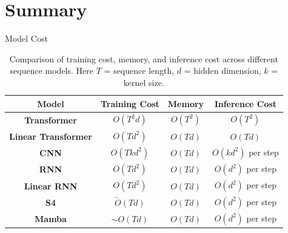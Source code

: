 \documentclass[xcolor=dvipsnames,aspectratio=169]{beamer}
\begin{document}
    \section{Summary}
        \begin{frame}{Model Cost}
            \begin{table}[h]
                \centering
                \renewcommand{\arraystretch}{1.4}
                \begin{tabular}{|c|c|c|c|}
                    \hline
                    \textbf{Model} & \textbf{Training Cost} & \textbf{Memory} & \textbf{Inference Cost} \\
                    \hline
                    \textbf{Transformer} 
                    & $O(T^2 d)$ 
                    & $O(T^2)$ 
                    & $O(T^2)$ \\
                    \hline
                    \textbf{Linear Transformer} 
                    & $O(T d^2)$ 
                    & $O(T d)$ 
                    & $O(T d)$ \\
                    \hline
                    \textbf{CNN}
                    & $O(T k d^2)$ 
                    & $O(T d)$ 
                    & $O(k d^2)$ per step \\
                    \hline
                    \textbf{RNN} 
                    & $O(T d^2)$ 
                    & $O(T d)$ 
                    & $O(d^2)$ per step \\
                    \hline
                    \textbf{Linear RNN} 
                    & $O(T d^2)$ 
                    & $O(T d)$ 
                    & $O(d^2)$ per step \\
                    \hline
                    \textbf{S4}
                    & $\tilde O(T d)$ 
                    & $O(T d)$ 
                    & $O(d^2)$ per step \\
                    \hline
                    \textbf{Mamba} 
                    & $\sim O(T d)$ 
                    & $O(T d)$ 
                    & $O(d^2)$ per step \\
                    \hline
                \end{tabular}
                \caption{Comparison of training cost, memory, and inference cost across different sequence models. 
                Here $T$ = sequence length, $d$ = hidden dimension, $k$ = kernel size.}
                \label{tab:model_costs}
            \end{table}
        \end{frame}
\end{document}
